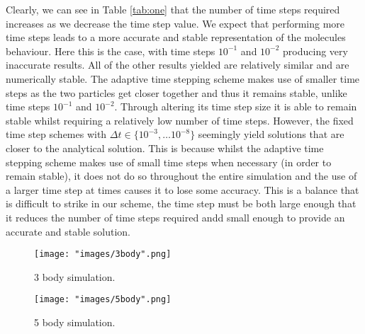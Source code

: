 \documentclass[12pt, a4paper]{article}
\begin{document}
\par Clearly, we can see in Table \ref{tab:one} that the number of time steps required increases as we decrease the time step value. We expect that performing more time steps leads to a more accurate and stable representation of the molecules behaviour. Here this is the case, with time steps $10^{-1}$ and $10^{-2}$ producing very inaccurate results. All of the other results yielded are relatively similar and are numerically stable. The adaptive time stepping scheme makes use of smaller time steps as the two particles get closer together and thus it remains stable, unlike time steps $10^{-1}$ and $10^{-2}$. Through altering its time step size it is able to remain stable whilst requiring a relatively low number of time steps. However,  the fixed time step schemes with $\Delta t \in \{10^{-3}, \dots 10^{-8}\}$ seemingly yield solutions that are closer to the analytical solution. This is because whilst the adaptive time stepping scheme makes use of small time steps when necessary (in order to remain stable), it does not do so throughout the entire simulation and the use of a larger time step at times causes it to lose some accuracy. This is a balance that is difficult to strike in our scheme, the time step must be both large enough that it reduces the number of time steps required andd small enough to provide an accurate and stable solution.

\begin{figure}[!htb]
    \centering
    \begin{minipage}{.55\textwidth}
        \centering
        \texttt{[image: "images/3body".png]}
        \caption{3 body simulation.}
        \label{fig:two}
    \end{minipage}%
    \begin{minipage}{0.55\textwidth}
        \centering
        \texttt{[image: "images/5body".png]}
        \caption{5 body simulation.}
        \label{fig:three}
    \end{minipage}
\end{figure}
\end{document}
